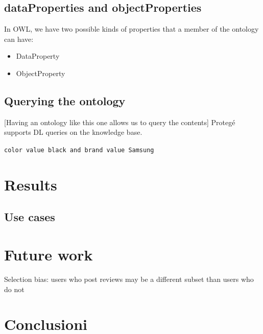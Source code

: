 \documentclass[LaM,binding=0.6cm]{sapthesis}
\begin{document}
\section{dataProperties and objectProperties}

In OWL, we have two possible kinds of properties that a member of the ontology can have:
\begin{itemize}
	\item DataProperty
	\item ObjectProperty
\end{itemize}

\section{Querying the ontology}

[Having an ontology like this one allows us to query the contents]
Protegé supports DL queries on the knowledge base.

\texttt{color value black and brand value Samsung}


\chapter{Results}

\section{Use cases}

\chapter{Future work}

Selection bias: users who post reviews may be a different subset than users who do not

\chapter{Conclusioni}


\backmatter
\cleardoublepage
{}
\end{document}
